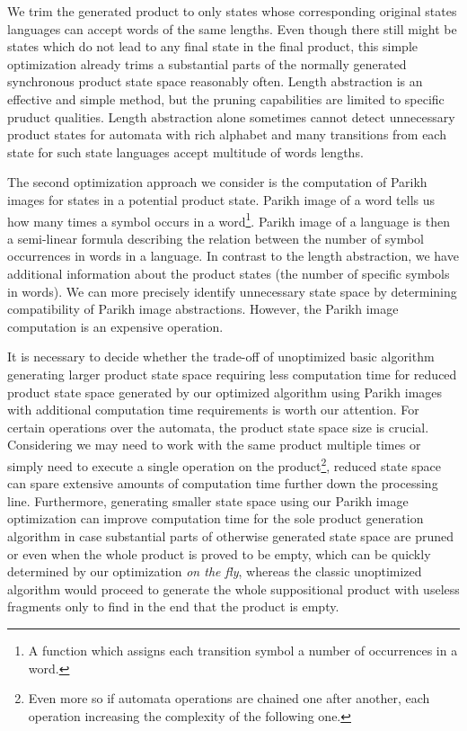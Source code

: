 We trim the generated product to only states whose corresponding original states languages can accept words of the same lengths. Even though there still might be states which do not lead to any final state in the final product, this simple optimization already trims a substantial parts of the normally generated synchronous product state space reasonably often. Length abstraction is an effective and simple method, but the pruning capabilities are limited to specific pruduct qualities. Length abstraction alone sometimes cannot detect unnecessary product states for automata with rich alphabet and many transitions from each state for such state languages accept multitude of words lengths.



The second optimization approach we consider is the computation of Parikh images for states in a potential product state. Parikh image of a word tells us how many times a symbol occurs in a word\footnote{A function which assigns each transition symbol a number of occurrences in a word.}. Parikh image of a language is then a semi-linear formula describing the relation between the number of symbol occurrences in words in a language. In contrast to the length abstraction, we have additional information about the product states (the number of specific symbols in words). We can more precisely identify unnecessary state space by determining compatibility of Parikh image abstractions. However, the Parikh image computation is an expensive operation.

It is necessary to decide whether the trade-off of unoptimized basic algorithm generating larger product state space requiring less computation time for reduced product state space generated by our optimized algorithm using Parikh images with additional computation time requirements is worth our attention. For certain operations over the automata, the product state space size is crucial. Considering we may need to work with the same product multiple times or simply need to execute a single operation on the product\footnote{Even more so if automata operations are chained one after another, each operation increasing the complexity of the following one.}, reduced state space can spare extensive amounts of computation time further down the processing line. Furthermore, generating smaller state space using our Parikh image optimization can improve computation time for the sole product generation algorithm in case substantial parts of otherwise generated state space are pruned or even when the whole product is proved to be empty, which can be quickly determined by our optimization \emph{on the fly}, whereas the classic unoptimized algorithm would proceed to generate the whole suppositional product with useless fragments only to find in the end that the product is empty.

